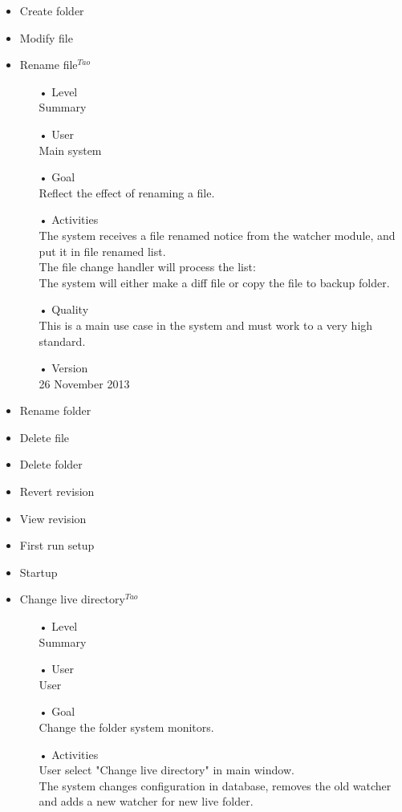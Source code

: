 \documentclass[12pt,a4paper]{article}
\begin{document}
\begin{itemize}
\item Create folder
\item Modify file
\item Rename file$^{Tao}$
\begin{enumerate}
	\item[•] Level \hfill \\
	Summary
	\item[•] User \hfill \\
	Main system
	\item[•] Goal \hfill \\
	Reflect the effect of renaming a file.
	\item[•] Activities \hfill \\
	The system receives a file renamed notice from the watcher module, and put it in file renamed list.\\
	The file change handler will process the list: \\
	The system will either make a diff file or copy the file to backup folder.
	\item[•] Quality \hfill \\
	This is a main use case in the system and must work to a very high standard.
	\item[•] Version \hfill \\
	26 November 2013	
\end{enumerate}
\item Rename folder
\item Delete file
\item Delete folder
\item Revert revision
\item View revision
\item First run setup
\item Startup
\item Change live directory$^{Tao}$
\begin{enumerate}
	\item[•] Level \hfill \\
	Summary
	\item[•] User \hfill \\
	User
	\item[•] Goal \hfill \\
	Change the folder system monitors.
	\item[•] Activities \hfill \\
	User select "Change live directory" in main window.\\
	The system changes configuration in database, removes the old watcher and adds a new watcher for new live folder.\\

\end{enumerate}
\end{itemize}
\end{document}
